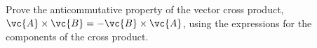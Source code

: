 Prove the anticommutative property of the vector cross
product, $\vc{A}\times\vc{B} = -\vc{B}\times\vc{A}$,
using the expressions for the components
of the cross product.
